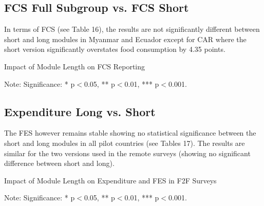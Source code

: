 \documentclass[11pt,harvard]{article}
\begin{document}
	\subsection{FCS Full Subgroup vs. FCS Short}
	
	In terms of FCS (see Table 16), the results are not significantly different between short and long modules in Myanmar and Ecuador except for CAR where the short version significantly overstates food consumption by 4.35 points.
	
	\begin{table}[htbp]
		\centering
		\begin{adjustbox}{max width=\textwidth}
			\begin{threeparttable}
				\caption{Impact of Module Length on FCS Reporting}
				\scriptsize
				 
				\label{tab:FCS_F2F_Form_Length_All_Country}
				\begin{tablenotes}
					\item Note: Significance: * p$<$0.05, ** p$<$0.01, *** p$<$0.001. 
				\end{tablenotes}
			\end{threeparttable}
		\end{adjustbox}
	\end{table}
	
	\subsection{Expenditure Long vs. Short}
	
	The FES however remains stable showing no statistical significance between the short and long modules in all pilot countries (see Tables 17). The results are similar for the two versions used in the remote surveys (showing no significant difference between short and long).
	
	\begin{table}[htbp]
		\centering
		\begin{adjustbox}{max width=\textwidth}
			\begin{threeparttable}
				\caption{Impact of Module Length on Expenditure and FES in F2F Surveys}
				\scriptsize
				 
				\label{tab:FES_F2F_Form_Length_All_Country}
				\begin{tablenotes}
					\item Note: Significance: * p$<$0.05, ** p$<$0.01, *** p$<$0.001. 
				\end{tablenotes}
			\end{threeparttable}
		\end{adjustbox}
	\end{table}
	
\end{document}
